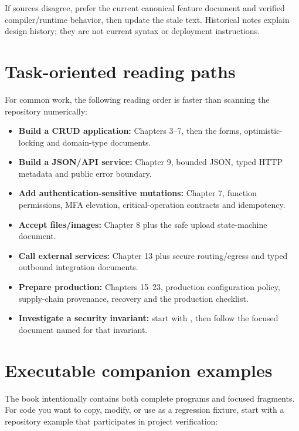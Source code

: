 If sources disagree, prefer the current canonical feature document and verified compiler/runtime behavior, then update the stale text. Historical notes explain design history; they are not current syntax or deployment instructions.

\section{Task-oriented reading paths}

For common work, the following reading order is faster than scanning the repository numerically:

\begin{itemize}
  \item \textbf{Build a CRUD application:} Chapters 3--7, then the forms, optimistic-locking and domain-type documents.
  \item \textbf{Build a JSON/API service:} Chapter 9, bounded JSON, typed HTTP metadata and public error boundary.
  \item \textbf{Add authentication-sensitive mutations:} Chapter 7, function permissions, MFA elevation, critical-operation contracts and idempotency.
  \item \textbf{Accept files/images:} Chapter 8 plus the safe upload state-machine document.
  \item \textbf{Call external services:} Chapter 13 plus secure routing/egress and typed outbound integration documents.
  \item \textbf{Prepare production:} Chapters 15--23, production configuration policy, supply-chain provenance, recovery and the production checklist.
  \item \textbf{Investigate a security invariant:} start with , then follow the focused document named for that invariant.
\end{itemize}

\section{Executable companion examples}

The book intentionally contains both complete programs and focused fragments. For code you want to copy, modify, or use as a regression fixture, start with a repository example that participates in project verification:

